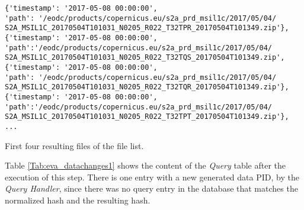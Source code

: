 \documentclass[draft,final]{vutinfth} %
\newenvironment{code}{\captionsetup{type=listing}}{}
\begin{document}
\begin{enumerate}
	\begin{code}
		\begin{verbatim}
{'timestamp': '2017-05-08 00:00:00', 
'path': '/eodc/products/copernicus.eu/s2a_prd_msil1c/2017/05/04/
S2A_MSIL1C_20170504T101031_N0205_R022_T32TPR_20170504T101349.zip'}, 
{'timestamp': '2017-05-08 00:00:00',
'path':'/eodc/products/copernicus.eu/s2a_prd_msil1c/2017/05/04/
S2A_MSIL1C_20170504T101031_N0205_R022_T32TQS_20170504T101349.zip', 
{'timestamp': '2017-05-08 00:00:00', 
'path': '/eodc/products/copernicus.eu/s2a_prd_msil1c/2017/05/04/
S2A_MSIL1C_20170504T101031_N0205_R022_T32TQR_20170504T101349.zip'}, 
{'timestamp': '2017-05-08 00:00:00',
'path':'/eodc/products/copernicus.eu/s2a_prd_msil1c/2017/05/04/
S2A_MSIL1C_20170504T101031_N0205_R022_T32TPT_20170504T101349.zip'},
...
		\end{verbatim}
		\caption{First four resulting files of the file list.}
		\label{lst:eva_datachange_rf1}
	\end{code}
	
	Table \ref{Tab:eva_datachanges1} shows the content of the \textit{Query} table after the execution of this step. There is one entry with a new generated data PID, by the \textit{Query Handler}, since there was no query entry in the database that matches the normalized hash and the resulting hash.
	
	

\end{enumerate}
\end{document}
